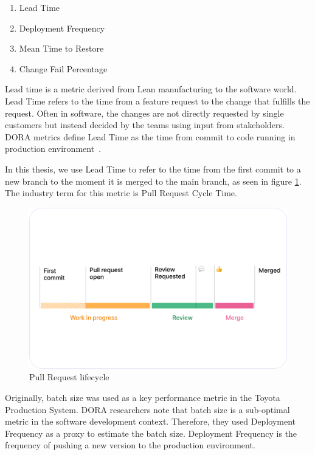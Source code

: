 \begin{enumerate}
\item Lead Time
\item Deployment Frequency
\item Mean Time to Restore
\item Change Fail Percentage
\end{enumerate}

Lead time is a metric derived from Lean manufacturing to the software world. Lead Time refers to the time from a feature request to the change that fulfills the request. Often in software, the changes are not directly requested by single customers but instead decided by the teams using input from stakeholders. DORA metrics define Lead Time as the time from commit to code running in production environment~\cite{forsgren_accelerate_2018}.

In this thesis, we use Lead Time to refer to the time from the first commit to a new branch to the moment it is merged to the main branch, as seen in figure \ref{fig:CycleTime}. The industry term for this metric is Pull Request Cycle Time. 

\begin{figure}[ht]
    \begin{center}
        \includegraphics[width=13.5cm]{images/cycletime_defined}
        \caption{Pull Request lifecycle~\cite{swarmia_reducing_nodate}}
        \label{fig:CycleTime}
    \end{center}
\end{figure}

Originally, batch size was used as a key performance metric in the Toyota Production System. DORA researchers note that batch size is a sub-optimal metric in the software development context. Therefore, they used Deployment Frequency as a proxy to estimate the batch size. Deployment Frequency is the frequency of pushing a new version to the production environment.  


